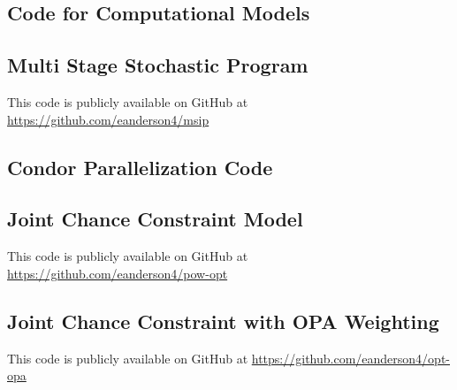 \begin{appendices}
\chapter{Code for Computational Models}

\section{Multi Stage Stochastic Program}
This code is publicly available on GitHub at
\url{https://github.com/eanderson4/msip}

\section{Condor Parallelization Code}

\linespread{1}
\scriptsize






%







\linespread{2}


\section{Joint Chance Constraint Model}
This code is publicly available on GitHub at
\url{https://github.com/eanderson4/pow-opt}

\section{Joint Chance Constraint with OPA Weighting}
This code is publicly available on GitHub at
\url{https://github.com/eanderson4/opt-opa}


\end{appendices}


